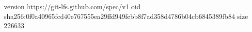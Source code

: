 version https://git-lfs.github.com/spec/v1
oid sha256:0f0a40965fcd40e767555ea29ffd949fcbb8f7ad358d4786b04cb6845389fb84
size 226633
